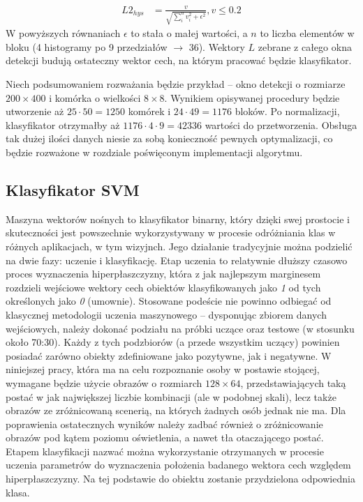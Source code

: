 \begin{equation}
\label{eq:HOG_norm4}
\left.\begin{aligned} 
L2_{hys}&=\frac{v}{\sqrt{\sum_{i}^{n}v_i^2+\epsilon^2}}, v\leq 0.2
\end{aligned}\right.
\end{equation}
W powyższych równaniach $\epsilon$ to stała o małej wartości, a $n$ to liczba elementów w bloku (4 histogramy po 9 przedziałów $\rightarrow$ 36). Wektory $L$ zebrane z całego okna detekcji budują ostateczny wektor cech, na którym pracować będzie klasyfikator.

Niech podsumowaniem rozważania będzie przykład -- okno detekcji o rozmiarze $200\times 400$ i komórka o wielkości $8 \times 8$. 
Wynikiem opisywanej procedury będzie utworzenie aż $25\cdot50=1250$ komórek i $24\cdot 49=1176$ bloków. 
Po normalizacji, klasyfikator otrzymałby aż $1176\cdot4\cdot9=42336$ wartości do przetworzenia. 
Obsługa tak dużej ilości danych niesie za sobą konieczność pewnych optymalizacji, co będzie rozważone w rozdziale poświęconym implementacji algorytmu.

\subsection{Klasyfikator SVM}

Maszyna wektorów nośnych to klasyfikator binarny, który dzięki swej prostocie i skuteczności jest powszechnie wykorzystywany w procesie odróżniania klas w różnych aplikacjach, w tym wizyjnch. %
Jego działanie tradycyjnie można podzielić na dwie fazy: uczenie i klasyfikację. 
Etap uczenia to relatywnie dłuższy czasowo proces wyznaczenia hiperpłaszczyzny, która z jak najlepszym marginesem rozdzieli wejściowe wektory cech obiektów klasyfikowanych jako \textit{1} od tych określonych jako \textit{0} (umownie). 
Stosowane podeście nie powinno odbiegać od klasycznej metodologii uczenia maszynowego -- dysponując zbiorem danych wejściowych, należy dokonać podziału na próbki uczące oraz testowe (w stosunku około 70:30). %
Każdy z tych podzbiorów (a przede wszystkim uczący) powinien posiadać zarówno obiekty zdefiniowane jako pozytywne, jak i negatywne. 
W niniejszej pracy, która ma na celu rozpoznanie osoby w postawie stojącej, wymagane będzie użycie obrazów o rozmiarch $128\times64$, przedstawiających taką postać w jak największej liczbie kombinacji (ale w podobnej skali), lecz także obrazów ze zróżnicowaną scenerią, na których żadnych osób jednak nie ma. 
Dla poprawienia ostatecznych wyników należy zadbać również o zróżnicowanie obrazów pod kątem poziomu oświetlenia, a nawet tła otaczającego postać.
Etapem klasyfikacji nazwać można wykorzystanie otrzymanych w procesie uczenia parametrów do wyznaczenia położenia badanego wektora cech względem hiperpłaszczyzny. 
Na tej podstawie do obiektu zostanie przydzielona odpowiednia klasa.

